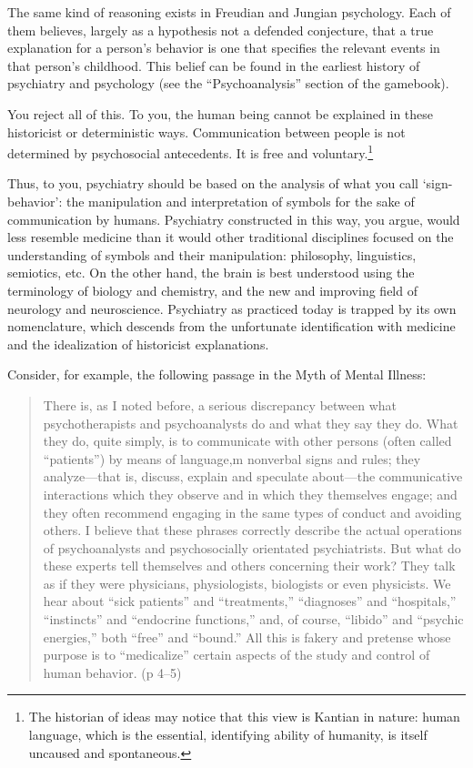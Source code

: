 The same kind of reasoning exists in Freudian and Jungian psychology. Each of them believes, largely as a hypothesis not a defended conjecture, that a true explanation for a person's behavior is one that specifies the relevant events in that person's childhood. This belief can be found in the earliest history of psychiatry and psychology (see the ``Psychoanalysis'' section of the gamebook).

You reject all of this. To you, the human being cannot be explained in these historicist or deterministic ways. Communication between people is not determined by psychosocial antecedents. It is free and voluntary.\footnote{The historian of ideas may notice that this view is Kantian in nature: human language, which is the essential, identifying ability of humanity, is itself uncaused and spontaneous.}

Thus, to you, psychiatry should be based on the analysis of what you call `sign-behavior': the manipulation and interpretation of symbols for the sake of communication by humans. Psychiatry constructed in this way, you argue, would less resemble medicine than it would other traditional disciplines focused on the understanding of symbols and their manipulation: philosophy, linguistics, semiotics, etc. On the other hand, the brain is best understood using the terminology of biology and chemistry, and the new and improving field of neurology and neuroscience. Psychiatry as practiced today is trapped by its own nomenclature, which descends from the unfortunate identification with medicine and the idealization of historicist explanations.

Consider, for example, the following passage in the Myth of Mental Illness:

\begin{quote}

There is, as I noted before, a serious discrepancy between what psychotherapists and psychoanalysts do and what they say they do. What they do, quite simply, is to communicate with other persons (often called ``patients'') by means of language,m nonverbal signs and rules; they analyze---that is, discuss, explain and speculate about---the communicative interactions which they observe and in which they themselves engage; and they often recommend engaging in the same types of conduct and avoiding others. I believe that these phrases correctly describe the actual operations of psychoanalysts and psychosocially orientated psychiatrists. But what do these experts tell themselves and others concerning their work? They talk as if they were physicians, physiologists, biologists or even physicists. We hear about ``sick patients'' and ``treatments,'' ``diagnoses'' and ``hospitals,'' ``instincts'' and ``endocrine functions,'' and, of course, ``libido'' and ``psychic energies,'' both ``free'' and ``bound.'' All this is fakery and pretense whose purpose is to ``medicalize'' certain aspects of the study and control of human behavior. (p 4--5)
\end{quote}

